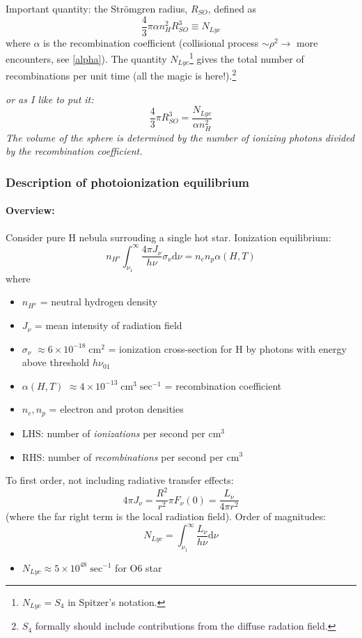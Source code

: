 \documentclass[12pt]{article}
\newcommand{\mar}[1]{\hspace{0pt}\marginpar{-\textcolor{black}{#1}-}}
\newcommand{\mynotes}[1]{{\fontfamily{cmss}\selectfont \textit{#1}}}
\begin{document}
Important quantity: the Str\"{o}mgren radius, $R_{SO}$, defined as
\[
    \frac{4}{3}\pi\alpha{n_{H}^{2}}{R_{SO}^{3}} \equiv N_{Lyc}
    \]
where $\alpha$ is the recombination coefficient
(collisional process $\sim\rho^{2} \rightarrow$ more encounters, see \ref{alpha}).
The quantity $N_{Lyc}$\footnote{$N_{Lyc} = S_{4}$ in Spitzer's notation.}
gives the total number of recombinations per unit
time (all the magic is here!).\footnote{$S_{4}$ formally should include
contributions from the diffuse radation field.}

\mynotes{or as I like to put it:
\[
    \frac{4}{3}\pi{R_{SO}^{3}} = \frac{ N_{Lyc}}{\alpha{n_{H}^{2}}}
    \]
The volume of the sphere is determined by the number of ionizing photons
divided by the recombination coefficient.}

\subsubsection{Description of photoionization equilibrium}
\mar{53}
\paragraph{Overview:} Consider pure H nebula surrouding a single hot star.
Ionization equilibrium:
\[
    n_{H^{o}}\int_{\nu_{1}}^{\infty}{
        \frac{4\pi{J_{\nu}}}{h\nu}\sigma_{\nu}\mathrm{d}\nu}
    = n_{e}n_{p}\alpha(H,T)
    \]
where
\begin{itemize}
    \item $n_{H^{o}}$ = neutral hydrogen density
    \item $J_{\nu}$ = mean intensity of radiation field
    \item $\sigma_{\nu}$
        $ \approx 6\times10^{-18}\;\mathrm{cm}^{2} $
        = ionization cross-section for H by photons with
        energy above threshold $h\nu_{01}$
    \item $\alpha(H,T)$
        $ \approx 4\times10^{-13}\;\mathrm{cm}^{3}\;\mathrm{sec}^{-1} $
        = recombination coefficient
    \item $n_{e}, n_{p}$ = electron and proton densities
    \item LHS: number of \emph{ionizations} per second per cm$^{3}$
    \item RHS: number of \emph{recombinations} per second per cm$^{3}$
\end{itemize}
To first order, not including radiative transfer effects:
\[
    4\pi{J_{\nu}} = \frac{R^{2}}{r^{2}}\pi{F_{\nu}}(0) =
    \frac{L_{\nu}}{4\pi{r^{2}}}
    \]
(where the far right term is the local radiation field). Order of magnitudes:
\[
    N_{Lyc} = \int_{\nu_{1}}^{\infty}{\frac{L_{\nu}}{h\nu}\mathrm{d}\nu}
    \]
\begin{itemize}
    \item $N_{Lyc} \approx 5\times10^{48}\;\mathrm{sec}^{-1}$ for O6 star
\end{itemize}
\end{document}
